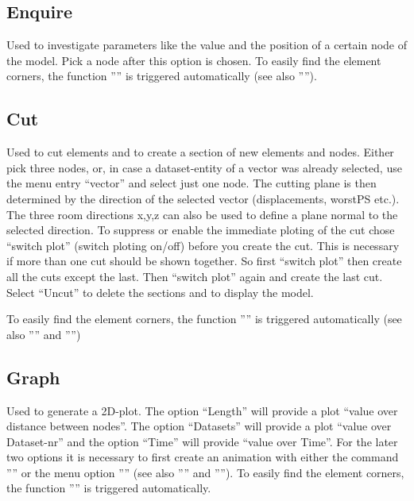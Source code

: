 \documentclass{article}
\begin{document}
\subsection{\label{Enquire}Enquire}
Used to investigate parameters like the value and the position of a certain node of the model. Pick a node after this option is chosen. To easily find the element corners, the function '''' is triggered automatically (see also '''').

\subsection{\label{Cut}Cut}
Used to cut elements and to create a section of new elements and nodes. Either pick three nodes, or, in case a dataset-entity of a vector was already selected, use the menu entry ``vector'' and select just one node. The cutting plane is then determined by the direction of the selected vector (displacements, worstPS etc.). The three room directions x,y,z can also be used to define a plane normal to the selected direction. To suppress or enable the immediate ploting of the cut chose ``switch plot'' (switch ploting on/off) before you create the cut. This is necessary if more than one cut should be shown together. So first ``switch plot'' then create all the cuts except the last. Then ``switch plot'' again and create the last cut. Select ``Uncut'' to delete the sections and to display the model. 

To easily find the element corners, the function '''' is triggered automatically (see also '''' and '''')

\subsection{\label{Graph}Graph}
Used to generate a 2D-plot. The option ``Length'' will provide a plot ``value over distance between nodes''. The option ``Datasets'' will provide a plot ``value over Dataset-nr'' and the option ``Time'' will provide ``value over Time''. For the later two options it is necessary to first create an animation with either the command '''' or the menu option '''' (see also '''' and ''''). To easily find the element corners, the function '''' is triggered automatically.
\end{document}
